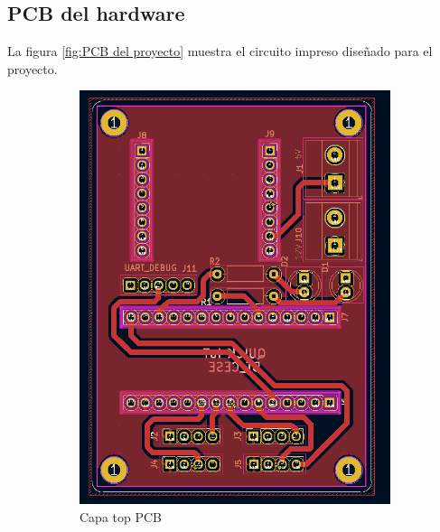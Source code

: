 \subsection{PCB del hardware} 
La figura \ref{fig:PCB del proyecto} muestra el circuito impreso diseñado para el proyecto.

\begin{figure}[h!]
  \centering
  \begin{subfigure}[b]{0.28\linewidth}
  \includegraphics[width=\linewidth]{./Figures/pcb_top.png}
  \caption{Capa top PCB}
  \label{fig:Capa top PCB}
  \end{subfigure}
  \begin{subfigure}[b]{0.27\linewidth}

\end{subfigure}
\end{figure}

